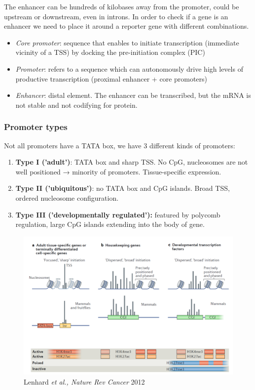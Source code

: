 The enhancer can be hundreds of kilobases away from the promoter, could be upstream or downstream, even in introns. In order to check if a gene is an enhancer we need to place it around a reporter gene with different combinations.

\begin{itemize}
\tightlist
\item
  \emph{Core promoter}: sequence that enables to initiate transcription (immediate vicinity of a TSS) by docking the pre-initiation complex (PIC)
\item
  \emph{Promoter}: refers to a sequence which can autonomously drive high levels of productive transcription (proximal enhancer + core promoters)
\item
  \emph{Enhancer}: distal element. The enhancer can be transcribed, but the mRNA is not stable and not codifying for protein.
\end{itemize}

\hypertarget{promoter-types}{%
\subsubsection{\texorpdfstring{\textbf{Promoter types}}{Promoter types}}\label{promoter-types}}

Not all promoters have a TATA box, we have 3 different kinds of promoters:

\begin{enumerate}
\def\labelenumi{\arabic{enumi}.}
\tightlist
\item
  \textbf{Type I ('adult')}: TATA box and sharp TSS. No CpG, nucleosomes are not well positioned → minority of promoters. Tissue-specific expression.
\item
  \textbf{Type II ('ubiquitous')}: no TATA box and CpG islands. Broad TSS, ordered nucleosome configuration.
\item
  \textbf{Type III ('developmentally regulated'):} featured by polycomb regulation, large CpG islands extending into the body of gene.
\end{enumerate}

\begin{figure}
\centering
\includegraphics[width=\textwidth]{../_resources/Screenshot_2022-10-05_at_10-05-59.png}
\caption{Lenhard \emph{et al., Nature Rev Cancer} 2012}
\end{figure}

